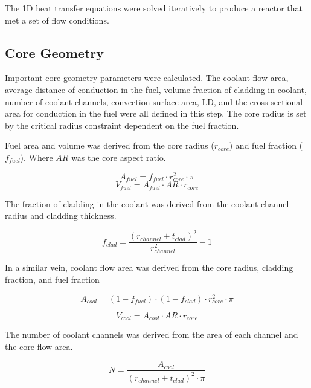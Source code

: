 The 1D heat transfer equations were solved iteratively to produce a reactor that
met a set of flow conditions.

\subsection{Core Geometry}
Important core geometry parameters were calculated. The coolant flow area,
average distance of conduction in the fuel, volume fraction of cladding in
coolant, number of coolant channels, convection surface area, LD, and the cross
sectional area for conduction in the fuel were all defined in this step. The
core radius is set by the critical
radius constraint dependent on the fuel fraction.

Fuel area and volume was derived from the core radius ($r_{core}$) and fuel
fraction ($f_{fuel}$). Where $AR$ was the core aspect ratio.

\begin{equation}
    A_{fuel} = f_{fuel}\cdot r_{core}^2 \cdot \pi
\end{equation}
\begin{equation}
    V_{fuel} = A_{fuel}\cdot AR\cdot r_{core}
\end{equation}

The fraction of cladding in the coolant was derived from the coolant channel
radius and cladding thickness.

\begin{equation}
    f_{clad} = \frac{(r_{channel} + t_{clad})^2}{r_{channel}^2} - 1 
\end{equation}

In a similar vein, coolant flow area was derived from the core radius, cladding
fraction, and fuel fraction

\begin{equation}
    A_{cool} = (1-f_{fuel})\cdot (1-f_{clad}) \cdot r_{core}^2 \cdot \pi
\end{equation}

\begin{equation}
    V_{cool} = A_{cool}\cdot AR\cdot r_{core}
\end{equation}

The number of coolant channels was derived from the area of each channel and the
core flow area.

\begin{equation}
    N = \frac{A_{cool}}{(r_{channel} + t_{clad})^2 \cdot \pi}
\end{equation}

